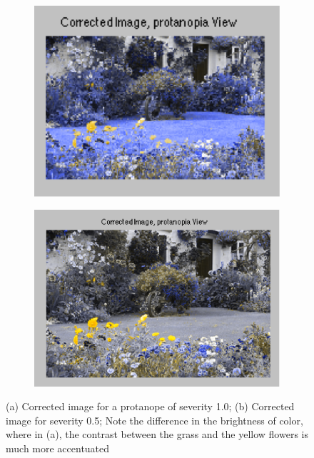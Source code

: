 \documentclass[10pt,twocolumn,letterpaper]{article}
\begin{document}
\begin{figure}[h]
  \centering
  \begin{subfigure}{0.22\textwidth}
    \includegraphics[width=\textwidth]{sev1.png}
    \caption{}
  \end{subfigure}
  \begin{subfigure}{0.24\textwidth}
    \includegraphics[width=\textwidth]{sev2.png}
    \caption{}
  \end{subfigure}
  \caption{(a) Corrected image for a protanope of severity 1.0; (b) Corrected image for severity 0.5; Note the difference in the brightness of color, where in (a), the contrast between the grass and the yellow flowers is much more accentuated}
  \label{fig:sev}
\end{figure}
\end{document}
